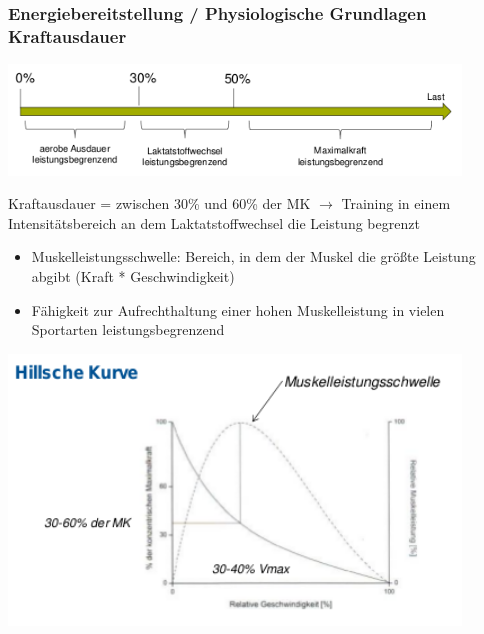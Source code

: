 \subsubsection*{Energiebereitstellung / Physiologische Grundlagen Kraftausdauer}

\includegraphics[width=0.9\textwidth]{pictures/kraftausdauer_bar}

Kraftausdauer = zwischen 30\% und 60\% der MK $\rightarrow$ Training in einem Intensitätsbereich an dem Laktatstoffwechsel die Leistung begrenzt

\begin{minipage}{0.3\textwidth}
    \begin{itemize}
        \item Muskelleistungsschwelle: Bereich, in dem der Muskel die größte Leistung abgibt (Kraft * Geschwindigkeit)
        \item Fähigkeit zur Aufrechthaltung einer hohen Muskelleistung in vielen Sportarten leistungsbegrenzend
    \end{itemize}
\end{minipage}
\begin{minipage}{0.7\textwidth}
    \includegraphics[width=0.9\textwidth]{pictures/hillsche_kurve}
\end{minipage}

